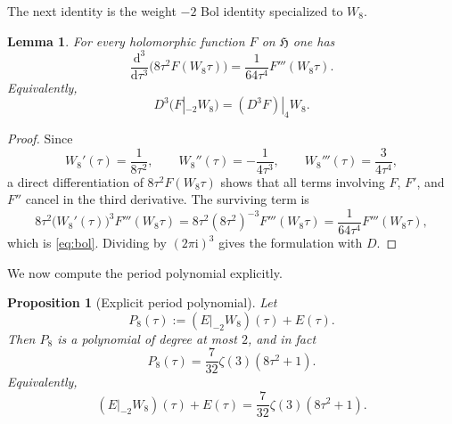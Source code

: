 \documentclass[11pt]{amsart}
\numberwithin{equation}{section}
\theoremstyle{plain}
\newtheorem{proposition}[theorem]{Proposition}
\newtheorem{lemma}[theorem]{Lemma}
\theoremstyle{definition}
\theoremstyle{remark}
\newcommand{\Hh}{\mathfrak{H}}
\newcommand{\dd}{\mathrm{d}}
\newcommand{\ii}{\mathrm{i}}
\newcommand{\Dop}{D}
\begin{document}
The next identity is the weight $-2$ Bol identity specialized to $W_8$.

\begin{lemma}\label{lem:bol}
For every holomorphic function $F$ on $\Hh$ one has
\begin{equation}\label{eq:bol}
\frac{\dd^3}{\dd\tau^3}\bigl(8\tau^2F(W_8\tau)\bigr)
=\frac{1}{64\tau^4}F'''(W_8\tau).
\end{equation}
Equivalently,
\[
\Dop^3(F|_{-2}W_8)=(\Dop^3F)|_4W_8.
\]
\end{lemma}

\begin{proof}
Since
\[
W_8'(\tau)=\frac{1}{8\tau^2},
\qquad
W_8''(\tau)=-\frac{1}{4\tau^3},
\qquad
W_8'''(\tau)=\frac{3}{4\tau^4},
\]
a direct differentiation of $8\tau^2F(W_8\tau)$ shows that all terms involving $F$, $F'$, and $F''$ cancel in the third derivative. The surviving term is
\[
8\tau^2\bigl(W_8'(\tau)\bigr)^3F'''(W_8\tau)
=8\tau^2(8\tau^2)^{-3}F'''(W_8\tau)
=\frac{1}{64\tau^4}F'''(W_8\tau),
\]
which is \eqref{eq:bol}. Dividing by $(2\pi\ii)^3$ gives the formulation with $\Dop$.
\end{proof}

We now compute the period polynomial explicitly.

\begin{proposition}[Explicit period polynomial]\label{prop:period-polynomial}
Let
\begin{equation}\label{eq:P8-def}
P_8(\tau):=(E|_{-2}W_8)(\tau)+E(\tau).
\end{equation}
Then $P_8$ is a polynomial of degree at most $2$, and in fact
\begin{equation}\label{eq:period-polynomial}
P_8(\tau)=\frac{7}{32}\zeta(3)(8\tau^2+1).
\end{equation}
Equivalently,
\begin{equation}\label{eq:E-transform}
(E|_{-2}W_8)(\tau)+E(\tau)=\frac{7}{32}\zeta(3)(8\tau^2+1).
\end{equation}
\end{proposition}
\end{document}
